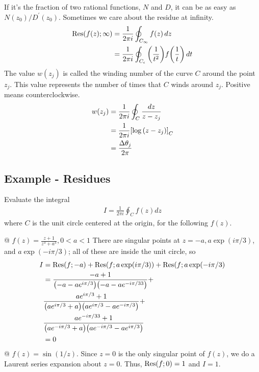     If it's the fraction of two rational functions, $N$ and $D$, it can be as
    easy as $N(z_0)/D^\prime(z_0)$. Sometimes we care about the residue at infinity.
    \begin{align*}
        \text{Res}{\left( f(z);\infty \right)}&=\frac{1}{2\pi i}\oint_{C_\infty}f(z)\,dz\\
        &=\frac{1}{2\pi i}
        \oint_{C_\epsilon}{\left( \frac{1}{t^2} \right)}f{\left( \frac{1}{t} \right)}\,dt
    \end{align*}
    The value $w(z_j)$ is called the winding number of the curve $C$ around the
    point $z_j$. This value represents the number of times that $C$ winds around
    $z_j$. Positive means counterclockwise.
    \begin{align*}
        w(z_j) &= \frac{1}{2\pi i} \oint_C \frac{dz}{z-z_j}\\
        &=\frac{1}{2\pi i} {\left[ \log{\left( z-z_j \right)} \right]}_C\\
        &= \frac{\Delta \theta_j}{2\pi}
    \end{align*}
    \subsection{Example - Residues}
    Evaluate the integral
    \begin{align*}
        I = \frac{1}{2\pi i} \oint_C f(z) dz
    \end{align*}
    where $C$ is the unit circle centered at the origin, for the following
    $f(z)$.
    \begin{easylist}[itemize]
        @ $f(z) = \frac{z+1}{z^3+a^3}, 0 < a < 1$
        There are singular points at $z=-a,a\exp(i\pi/3)$, and $a\exp(-i\pi/3)$;
        all of these are inside the unit circle, so
        \begin{align*}
            I &= \text{Res}(f; -a) + \text{Res}(f; a\exp(i\pi/3)) + \text{Res}(f;a\exp(-i\pi/3)\\
            &= \frac{-a+1}{{\left( -a-ae^{i\pi/3} \right)}{\left( -a-ae^{-i\pi/33} \right)}} +\\
            &\frac{ae^{i\pi/3}+1}{{\left( ae^{i\pi/3}+a \right)}{\left( ae^{i\pi/3}-ae^{-i\pi/3} \right)}}+\\
            &\frac{ae^{-i\pi/33}+1}{{\left( ae^{-i\pi/3}+a \right)}{\left( ae^{-i\pi/3}-ae^{i\pi/3} \right)}}\\
            &=0
        \end{align*}
        @ $f(z)=\sin(1/z)$. Since $z=0$ is the only singular point of $f(z)$, we
        do a Laurent series expansion about $z=0$. Thus, $\text{Res}(f;0)=1$ and
        $I=1$.
    \end{easylist}
